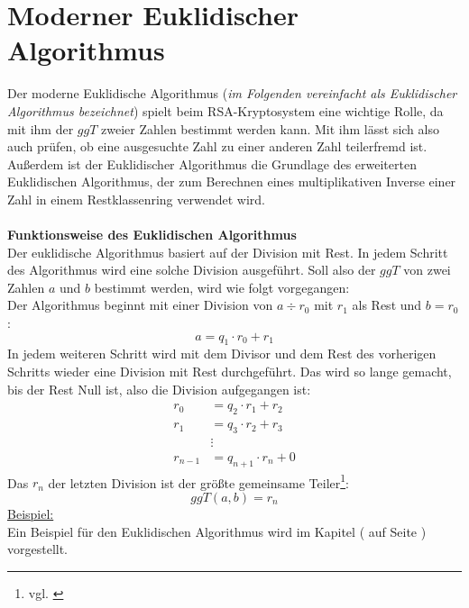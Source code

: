 \section{Moderner Euklidischer Algorithmus}
\label{sec:Euklid_Algorithm}
Der moderne Euklidische Algorithmus (\textit{im Folgenden vereinfacht als Euklidischer Algorithmus bezeichnet}) spielt beim RSA-Kryptosystem eine wichtige Rolle, da mit ihm der $ggT$ zweier Zahlen bestimmt werden kann. Mit ihm lässt sich also auch prüfen, ob eine ausgesuchte Zahl zu einer anderen Zahl teilerfremd ist. Außerdem ist der Euklidischer Algorithmus die Grundlage des erweiterten Euklidischen Algorithmus, der zum Berechnen eines multiplikativen Inverse einer Zahl in einem Restklassenring verwendet wird.\\
\\
\textbf{Funktionsweise des Euklidischen Algorithmus}\\
Der euklidische Algorithmus basiert auf der Division mit Rest. In jedem Schritt des Algorithmus wird eine solche Division ausgeführt.
Soll also der $ggT$ von zwei Zahlen $a$ und $b$ bestimmt werden, wird wie folgt vorgegangen:\\
Der Algorithmus beginnt mit einer Division von  $a\div r_{0}$ mit $r_1$ als Rest und $b=r_{0}$:
\begin{equation*}
a=q_1\cdot r_0 + r_1
\end{equation*}
In jedem weiteren Schritt wird mit dem Divisor und dem Rest des vorherigen Schritts wieder eine Division mit Rest durchgeführt. Das wird so lange gemacht, bis der Rest Null ist, also die Division aufgegangen ist:
\begin{align*}
r_0 &= q_2\cdot r_1 + r_2\\
r_1 &= q_3\cdot r_2 + r_3\\
&\vdots\\
r_{n-1} &= q_{n+1}\cdot r_n + 0
\end{align*}
Das $r_n$ der letzten Division ist der größte gemeinsame Teiler\footnote{vgl. \cite{euklid}}:
\begin{equation*}
ggT(a,b)=r_n
\end{equation*}
\underline{Beispiel:}\\
Ein Beispiel für den Euklidischen Algorithmus wird im Kapitel (\textit{} auf Seite \pageref{euklid_beispiel}) vorgestellt.
